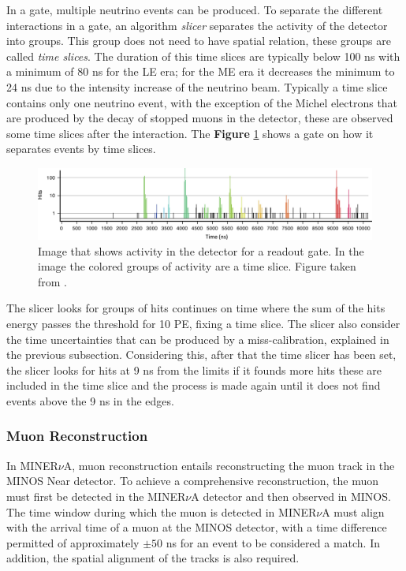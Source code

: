In a gate, multiple neutrino events can be produced. To separate the different interactions in a gate, an algorithm \textit{ slicer} separates the activity of the detector into groups. This group does not need to have spatial relation, these groups are called \textit{time slices}. The duration of this time slices are typically below 100 ns with a minimum of 80 ns for the LE era; for the ME era it decreases the minimum to 24 ns due to the intensity increase of the neutrino beam. Typically a time slice contains only one neutrino event, with the exception of the Michel electrons that are produced by the decay of stopped muons in the detector, these are observed some time slices after the interaction. The \textbf{Figure} \ref{fig:MnvExp:MnvDetector:CalibrationOneGate} shows a gate on how it separates events by time slices.

\begin{figure}[!htb]
    \centering
    \includegraphics[scale=1]{Figures/Chapter2/OneGate.jpg}
    \caption{Image that shows activity in the detector for a readout gate. In the image the colored groups of activity are a time slice. Figure taken from \cite{MINERvA}.}
    \label{fig:MnvExp:MnvDetector:CalibrationOneGate}
\end{figure}
The slicer looks for groups of hits continues on time where the sum of the hits energy passes the threshold for 10 PE, fixing a time slice. The slicer also consider the time uncertainties that can be produced by a miss-calibration, explained in the previous subsection. Considering this, after that the time slicer has been set, the slicer looks for hits at 9 ns from the limits if it founds more hits these are included in the time slice and the process is made again until it does not find events above the 9 ns in the edges. 

\subsubsection{Muon Reconstruction}
\label{Cap:MnvExp:MnvDetector:DataReconstruction:MuonReconstruction}
In MINER$\nu$A, muon reconstruction entails reconstructing the muon track in the MINOS Near detector. To achieve a comprehensive reconstruction, the muon must first be detected in the MINER$\nu$A detector and then observed in MINOS. The time window during which the muon is detected in MINER$\nu$A must align with the arrival time of a muon at the MINOS detector, with a time difference permitted of approximately $\pm50$ ns for an event to be considered a match. In addition, the spatial alignment of the tracks is also required. 

